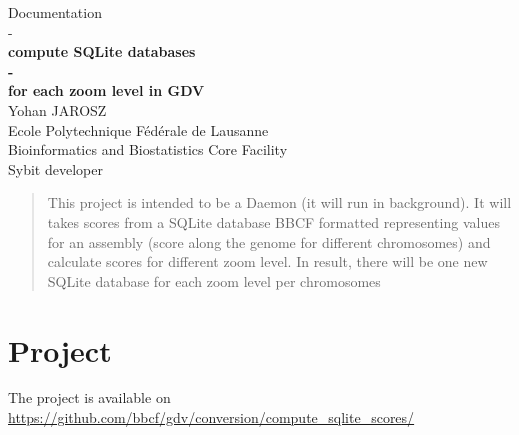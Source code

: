 \documentclass[11pt]{report}
\begin{document}
\ifpdf
{}
\else
{}
\fi




\begin{titlepage}

\centering
\huge{
Documentation\\-\\
\vspace{80mm}
	\textbf{compute SQLite databases\\ -\\ for each zoom level in GDV\\}
	}
\vspace{75mm}
\Large{Yohan JAROSZ}\\\large{Ecole Polytechnique Fédérale de Lausanne \\
Bioinformatics and Biostatistics Core Facility\\
Sybit developer}

\end{titlepage}


\begin{abstract}
This project is intended to be a Daemon (it will run in background). It will takes scores from a SQLite database BBCF formatted representing values for an assembly (score along the genome for different chromosomes) and calculate scores for different zoom level. In result, there will be one new SQLite database for each zoom level per chromosomes
\end{abstract}

\newpage
\tableofcontents
\newpage

\chapter{Project}\label{c:project}

The project is available on \href{github}{https://github.com/bbcf/gdv/conversion/compute\_sqlite\_scores/} 
\end{document}
